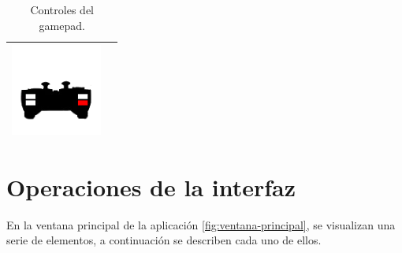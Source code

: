 \begin{table}[H]
\begin{center}
\begin{tabular}{|p{3cm}|p{8cm}|}
      \hline
      \includegraphics[width=3cm]{../imagenes/pad-12.png} & \vspace*{-.8in}{Sin función.} \\
      \hline
    \end{tabular}
  \end{center}
  \caption{Controles del gamepad.}
\end{table}


\section{Operaciones de la interfaz}
\label{sec:operaciones-interfaz}

En la ventana principal de la aplicación \ref{fig:ventana-principal}, se visualizan una serie de elementos, a continuación se describen cada uno de ellos.


